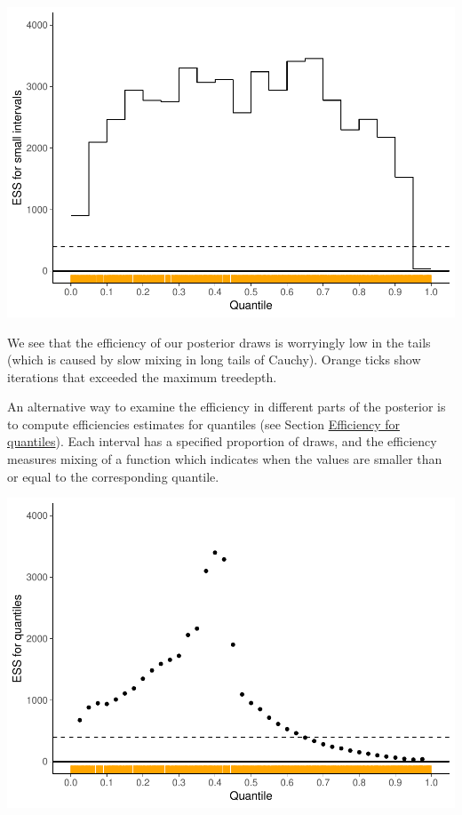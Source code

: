 \documentclass[american,]{article}
\begin{document}
\includegraphics{graphics/local-ess-fit-nom-1.pdf}

We see that the efficiency of our posterior draws is worryingly low in
the tails (which is caused by slow mixing in long tails of Cauchy).
Orange ticks show iterations that exceeded the maximum treedepth.

An alternative way to examine the efficiency in different parts of the
posterior is to compute efficiencies estimates for quantiles (see
Section \protect\hyperlink{quantile_S_eff}{Efficiency for quantiles}).
Each interval has a specified proportion of draws, and the efficiency
measures mixing of a function which indicates when the values are
smaller than or equal to the corresponding quantile.

\includegraphics{graphics/quantile-ess-fit-nom-1.pdf}
\end{document}
